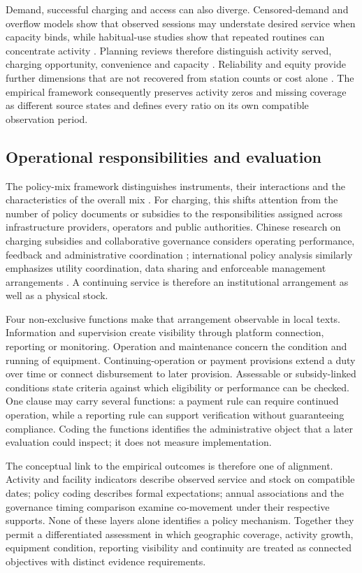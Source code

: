 Demand, successful charging and access can also diverge. Censored-demand and overflow models show that observed sessions may understate desired service when capacity binds, while habitual-use studies show that repeated routines can concentrate activity \citep{huttel2023,weekx2024,weekx2025_habits}. Planning reviews therefore distinguish activity served, charging opportunity, convenience and capacity \citep{patil2023}. Reliability and equity provide further dimensions that are not recovered from station counts or cost alone \citep{rempel2024,yu2025_reliability,zhangfan2025}. The empirical framework consequently preserves activity zeros and missing coverage as different source states and defines every ratio on its own compatible observation period.

\subsection{Operational responsibilities and evaluation}
The policy-mix framework distinguishes instruments, their interactions and the characteristics of the overall mix \citep{rogge2016}. For charging, this shifts attention from the number of policy documents or subsidies to the responsibilities assigned across infrastructure providers, operators and public authorities. Chinese research on charging subsidies and collaborative governance considers operating performance, feedback and administrative coordination \citep{hu2026,zhang2024}; international policy analysis similarly emphasizes utility coordination, data sharing and enforceable management arrangements \citep{tilly2025}. A continuing service is therefore an institutional arrangement as well as a physical stock.

Four non-exclusive functions make that arrangement observable in local texts. Information and supervision create visibility through platform connection, reporting or monitoring. Operation and maintenance concern the condition and running of equipment. Continuing-operation or payment provisions extend a duty over time or connect disbursement to later provision. Assessable or subsidy-linked conditions state criteria against which eligibility or performance can be checked. One clause may carry several functions: a payment rule can require continued operation, while a reporting rule can support verification without guaranteeing compliance. Coding the functions identifies the administrative object that a later evaluation could inspect; it does not measure implementation.

The conceptual link to the empirical outcomes is therefore one of alignment. Activity and facility indicators describe observed service and stock on compatible dates; policy coding describes formal expectations; annual associations and the governance timing comparison examine co-movement under their respective supports. None of these layers alone identifies a policy mechanism. Together they permit a differentiated assessment in which geographic coverage, activity growth, equipment condition, reporting visibility and continuity are treated as connected objectives with distinct evidence requirements.
